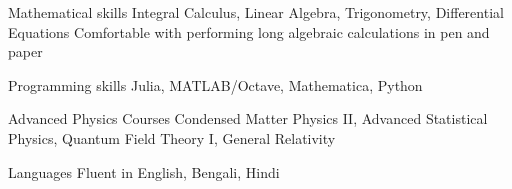 

\begin{cvskills}


  
  \cvskill
	{Mathematical skills} %
	{Integral Calculus, Linear Algebra, Trigonometry, Differential Equations}
  \cvskill
	{}
	{Comfortable with performing long algebraic calculations in pen and paper} %

  \cvskill
    {Programming skills} %
    {Julia, MATLAB/Octave, Mathematica, Python} %

  \cvskill
{Advanced Physics Courses} %
{Condensed Matter Physics II, Advanced Statistical Physics, Quantum Field Theory I, General Relativity} %

  \cvskill
    {Languages} %
    {Fluent in English, Bengali, Hindi} %

\end{cvskills}
